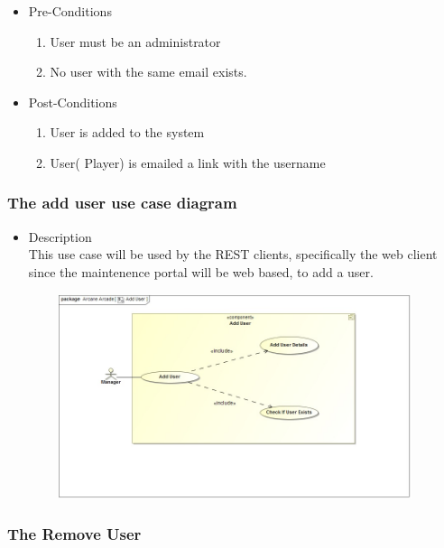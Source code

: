 \documentclass[english]{article}
\begin{document}
			\begin{itemize}
	
		
		\item Pre-Conditions
			\begin{enumerate}
				\item User must be an administrator
				\item No user with the same email exists.
			\end{enumerate}
		\item Post-Conditions
			\begin{enumerate}
			\item User is added to the system
			\item User( Player) is emailed a link with the username
						
			\end{enumerate}
	

\end{itemize}
		
		
		\subsubsection* {The add user use case diagram}
		\begin{itemize}
			\item Description\\
			This use case will be used by the REST clients, specifically the web client since the maintenence portal will be web based, to add a user.
		\end{itemize}
		\includegraphics[width=14cm,height=6cm,keepaspectratio]{addUser.jpg}
		
		
		\subsubsection{The Remove User}
		
\end{document}

